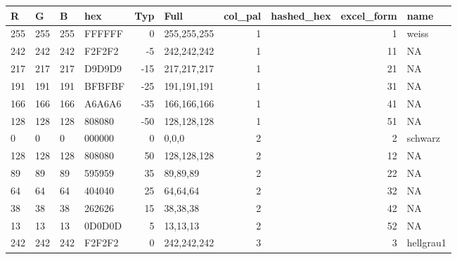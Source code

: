 \documentclass[
]{article}
\begin{document}
\begin{table}
\centering
\begin{tabular}[t]{l|l|l|l|r|l|r|l|r|l}
\hline
R & G & B & hex & Typ & Full & col_pal & hashed_hex & excel_form & name\\
\hline
255 & 255 & 255 & FFFFFF & 0 & 255,255,255 & 1 & \multicolumn{1}{c}{\cellcolor[HTML]{FFFFFF}{\textcolor{white}{\#FFFFFF}}} & 1 & weiss\\
\hline
242 & 242 & 242 & F2F2F2 & -5 & 242,242,242 & 1 & \multicolumn{1}{c}{\cellcolor[HTML]{F2F2F2}{\textcolor{white}{\#F2F2F2}}} & 11 & NA\\
\hline
217 & 217 & 217 & D9D9D9 & -15 & 217,217,217 & 1 & \multicolumn{1}{c}{\cellcolor[HTML]{D9D9D9}{\textcolor{white}{\#D9D9D9}}} & 21 & NA\\
\hline
191 & 191 & 191 & BFBFBF & -25 & 191,191,191 & 1 & \multicolumn{1}{c}{\cellcolor[HTML]{BFBFBF}{\textcolor{white}{\#BFBFBF}}} & 31 & NA\\
\hline
166 & 166 & 166 & A6A6A6 & -35 & 166,166,166 & 1 & \multicolumn{1}{c}{\cellcolor[HTML]{A6A6A6}{\textcolor{white}{\#A6A6A6}}} & 41 & NA\\
\hline
128 & 128 & 128 & 808080 & -50 & 128,128,128 & 1 & \multicolumn{1}{c}{\cellcolor[HTML]{808080}{\textcolor{white}{\#808080}}} & 51 & NA\\
\hline
0 & 0 & 0 & 000000 & 0 & 0,0,0 & 2 & \multicolumn{1}{c}{\cellcolor[HTML]{000000}{\textcolor{white}{\#000000}}} & 2 & schwarz\\
\hline
128 & 128 & 128 & 808080 & 50 & 128,128,128 & 2 & \multicolumn{1}{c}{\cellcolor[HTML]{808080}{\textcolor{white}{\#808080}}} & 12 & NA\\
\hline
89 & 89 & 89 & 595959 & 35 & 89,89,89 & 2 & \multicolumn{1}{c}{\cellcolor[HTML]{595959}{\textcolor{white}{\#595959}}} & 22 & NA\\
\hline
64 & 64 & 64 & 404040 & 25 & 64,64,64 & 2 & \multicolumn{1}{c}{\cellcolor[HTML]{404040}{\textcolor{white}{\#404040}}} & 32 & NA\\
\hline
38 & 38 & 38 & 262626 & 15 & 38,38,38 & 2 & \multicolumn{1}{c}{\cellcolor[HTML]{262626}{\textcolor{white}{\#262626}}} & 42 & NA\\
\hline
13 & 13 & 13 & 0D0D0D & 5 & 13,13,13 & 2 & \multicolumn{1}{c}{\cellcolor[HTML]{0D0D0D}{\textcolor{white}{\#0D0D0D}}} & 52 & NA\\
\hline
242 & 242 & 242 & F2F2F2 & 0 & 242,242,242 & 3 & \multicolumn{1}{c}{\cellcolor[HTML]{F2F2F2}{\textcolor{white}{\#F2F2F2}}} & 3 & hellgrau1\\

\end{tabular}
\end{table}
\end{document}
